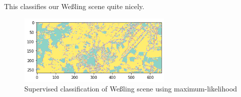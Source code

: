This classifies our Weßling scene quite nicely.
\begin{figure}[H]
    \caption{Supervised classification of Weßling scene using maximum-likelihood}
    \centering
      \includegraphics[width=0.65\textwidth]{images/max_likelihood_wessling.png}
\end{figure}





